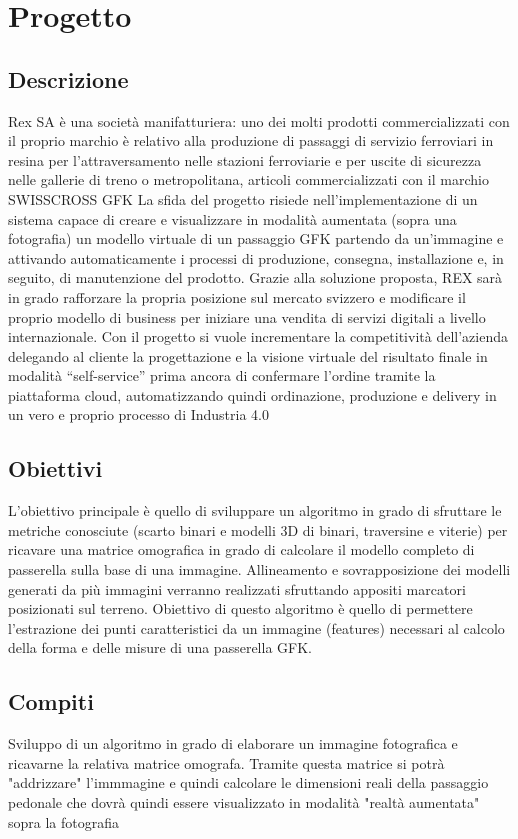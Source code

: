 \documentclass[twoside]{supsistudent}
\begin{document}
\chapter{Progetto}

\section{Descrizione}
Rex SA è una società manifatturiera: uno dei molti prodotti commercializzati con il proprio marchio è relativo alla
produzione di passaggi di servizio ferroviari in resina per l’attraversamento nelle stazioni ferroviarie e per uscite di
sicurezza nelle gallerie di treno o metropolitana, articoli commercializzati con il marchio SWISSCROSS GFK
La sfida del progetto risiede nell’implementazione di un sistema capace di creare e visualizzare in modalità aumentata
(sopra una fotografia) un modello virtuale di un passaggio GFK partendo da un'immagine e attivando automaticamente i
processi di produzione, consegna, installazione e, in seguito, di manutenzione del prodotto.
Grazie alla soluzione proposta, REX sarà in grado rafforzare la propria posizione sul mercato svizzero e modificare il
proprio modello di business per iniziare una vendita di servizi digitali a livello internazionale.
Con il progetto si vuole incrementare la competitività dell’azienda delegando al cliente la progettazione e la visione virtuale
del risultato finale in modalità “self-service” prima ancora di confermare l’ordine tramite la piattaforma cloud,
automatizzando quindi ordinazione, produzione e delivery in un vero e proprio processo di Industria 4.0

\section{Obiettivi}
L'obiettivo principale è quello di sviluppare un algoritmo in grado di sfruttare le metriche conosciute (scarto binari e modelli
3D di binari, traversine e viterie) per ricavare una matrice omografica in grado di calcolare il modello completo di passerella
sulla base di una immagine.
Allineamento e sovrapposizione dei modelli generati da più immagini verranno realizzati sfruttando appositi marcatori
posizionati sul terreno.
Obiettivo di questo algoritmo è quello di permettere l'estrazione dei punti caratteristici da un immagine (features) necessari
al calcolo della forma e delle misure di una passerella GFK.

\section{Compiti}
Sviluppo di un algoritmo in grado di elaborare un immagine fotografica e ricavarne la relativa matrice omografa.
Tramite questa matrice si potrà "addrizzare" l'immmagine e quindi calcolare le dimensioni reali della passaggio pedonale
che dovrà quindi essere visualizzato in modalità "realtà aumentata" sopra la fotografia
\end{document}
